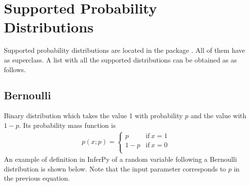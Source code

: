 \documentclass[letterpaper,10pt,english]{sphinxmanual}
\begin{document}
\section{Supported Probability Distributions}
\label{\detokenize{notes/guidemodels:supported-probability-distributions}}
Supported probability distributions are located in the package . All of them
have  as superclass. A list with all the supported distributions can be obtained as
as follows.

\begin{sphinxVerbatim}[commandchars=\\\{\}]
\end{sphinxVerbatim}


\subsection{Bernoulli}
\label{\detokenize{notes/guidemodels:bernoulli}}
Binary distribution which takes the value 1 with probability \(p\) and the value with \(1-p\). Its probability mass
function is
\begin{equation*}
\begin{split}p(x;p) =\left\{\begin{array}{cc} p & \mathrm{if\ } x=1 \\
 1-p & \mathrm{if\ } x=0 \\ \end{array} \right.\end{split}
\end{equation*}
An example of definition in InferPy of a random variable following a Bernoulli distribution is shown below. Note that the
input parameter  corresponds to \(p\) in the previous equation.

\begin{sphinxVerbatim}[commandchars=\\\{\}]
  


  
\end{sphinxVerbatim}
\end{document}
